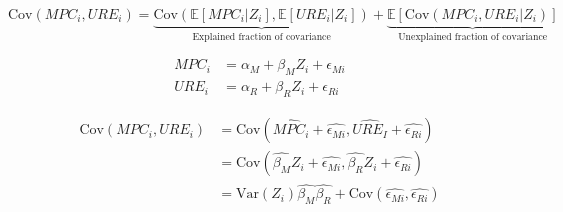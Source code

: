 \documentclass[11pt,letterpaper]{article}
\begin{document}
\begin{equation}
	\mathrm{Cov}(MPC_{i}, URE_{i}) = \underbrace{\mathrm{Cov}(\mathbb{E} \left[MPC_{i} | Z_{i}\right], \mathbb{E} \left[URE_{i} | Z_{i}\right])}_{\text{Explained fraction of covariance}} + \underbrace{\mathbb{E}\left[\mathrm{Cov} (MPC_{i}, URE_{i} | Z_{i})\right]}_{\text{Unexplained fraction of covariance}}
\end{equation}

\begin{align*}
	MPC_{i} &= \alpha_{M} + \beta_{M}Z_{i} + \epsilon_{Mi} \\
	URE_{i} &= \alpha_{R} + \beta_{R}Z_{i} + \epsilon_{Ri}
\end{align*}

\begin{equation}
\begin{align*}
	\mathrm{Cov} (MPC_{i}, URE_{i}) &= \mathrm{Cov}\left(\widehat{MPC_{i}} + \widehat{\epsilon_{Mi}}, \widehat{URE_{I}} + \widehat{\epsilon_{Ri}}\right) \\
	&= \mathrm{Cov}\left(\widehat{\beta_{M}}Z_{i} + \widehat{\epsilon_{Mi}}, \widehat{\beta_{R}}Z_{i} + \widehat{\epsilon_{Ri}}\right) \\
	&= \mathrm{Var} \left(Z_{i}\right)\widehat{\beta_{M}}\widehat{\beta_{R}} + \mathrm{Cov} \left(\widehat{\epsilon_{Mi}}, \widehat{\epsilon_{Ri}}\right)
\end{align*}
\end{equation}






\end{document}
